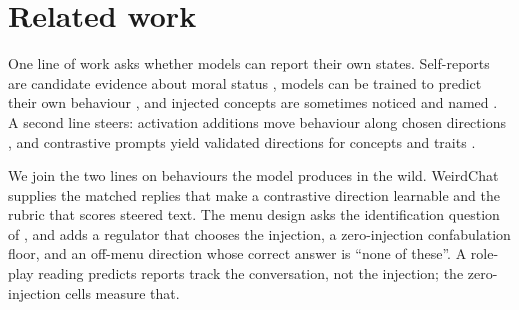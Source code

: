 \section{Related work}

One line of work asks whether models can report their own states. Self-reports are candidate evidence about moral status
\citep{perez2023selfreports, butlin2023consciousness}, models can be trained
to predict their own behaviour \citep{binder2024introspection}, and injected
concepts are sometimes noticed and named \citep{lindsey2025introspection}.
A second line steers: activation additions move behaviour along chosen
directions \citep{turner2023actadd}, and contrastive prompts yield validated
directions for concepts and traits \citep{zou2023repe, chen2025personavectors}.

We join the two lines on behaviours the model produces in the wild.
WeirdChat \citep{transluce2025weirdchat} supplies the matched replies that
make a contrastive direction learnable and the rubric that scores steered
text. The menu design asks the identification question of
\citet{lindsey2025introspection}, and adds a regulator that chooses the
injection, a zero-injection confabulation floor, and an off-menu direction whose correct answer is ``none of these''. A role-play reading
\citep{shanahan2023roleplay} predicts reports track the conversation, not
the injection; the zero-injection cells measure that.
